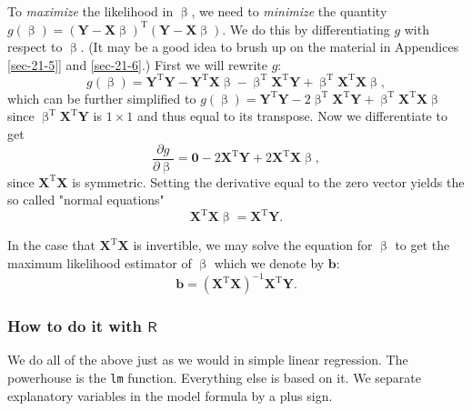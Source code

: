 To \emph{maximize} the likelihood  in \(\upbeta\),
we need to \emph{minimize} the quantity
\(g(\upbeta)=\left(\mathbf{Y}-\mathbf{X}\upbeta\right)^{\mathrm{T}}\left(\mathbf{Y}-\mathbf{X}\upbeta\right)\). We
do this by differentiating \(g\) with respect to \(\upbeta\). (It may
be a good idea to brush up on the material in Appendices \ref{sec-21-5}] and \ref{sec-21-6}.) First we will rewrite \(g\):
\begin{equation}
g(\upbeta)=\mathbf{Y}^{\mathrm{T}}\mathbf{Y}-\mathbf{Y}^{\mathrm{T}}\mathbf{X}\upbeta-\upbeta^{\mathrm{T}}\mathbf{X}^{\mathrm{T}}\mathbf{Y}+\upbeta^{\mathrm{T}}\mathbf{X}^{\mathrm{T}}\mathbf{X}\upbeta,
\end{equation}
which can be further simplified to
\(g(\upbeta)=\mathbf{Y}^{\mathrm{T}}\mathbf{Y}-2\upbeta^{\mathrm{T}}\mathbf{X}^{\mathrm{T}}\mathbf{Y}+\upbeta^{\mathrm{T}}\mathbf{X}^{\mathrm{T}}\mathbf{X}\upbeta\)
since \(\upbeta^{\mathrm{T}}\mathbf{X}^{\mathrm{T}}\mathbf{Y}\) is
\(1\times1\) and thus equal to its transpose. Now we differentiate to
get
\begin{equation}
\frac{\partial g}{\partial\upbeta}=\mathbf{0}-2\mathbf{X}^{\mathrm{T}}\mathbf{Y}+2\mathbf{X}^{\mathrm{T}}\mathbf{X}\upbeta,
\end{equation}
since \(\mathbf{X}^{\mathrm{T}}\mathbf{X}\) is symmetric. Setting the
derivative equal to the zero vector yields the so called "normal
equations" 
\begin{equation}
\mathbf{X}^{\mathrm{T}}\mathbf{X}\upbeta=\mathbf{X}^{\mathrm{T}}\mathbf{Y}.
\end{equation}

In the case that \(\mathbf{X}^{\mathrm{T}}\mathbf{X}\) is
invertible, we may solve the equation for \(\upbeta\) to
get the maximum likelihood estimator of \(\upbeta\) which we denote by
\(\mathbf{b}\):
\begin{equation}
\label{eq-b-formula-matrix}
\mathbf{b}=\left(\mathbf{X}^{\mathrm{T}}\mathbf{X}\right)^{-1}\mathbf{X}^{\mathrm{T}}\mathbf{Y}.
\end{equation}

\subsubsection{How to do it with \(\mathsf{R}\)}
\label{sec-12-2-1-1}

We do all of the above just as we would in simple linear
regression. The powerhouse is the \texttt{lm} 
function. Everything else is based on it. We separate explanatory
variables in the model formula by a plus sign.

